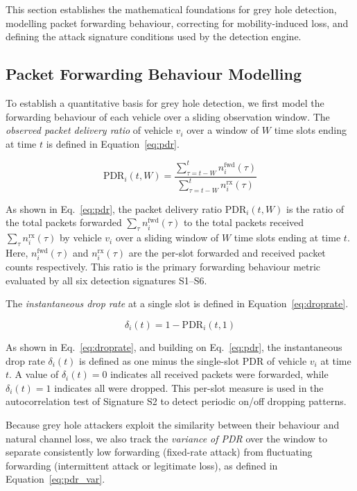 \documentclass[12pt, a4paper]{report}
\begin{document}
This section establishes the mathematical foundations for grey hole detection,
modelling packet forwarding behaviour, correcting for mobility-induced loss,
and defining the attack signature conditions used by the detection engine.

\subsection{Packet Forwarding Behaviour Modelling}

To establish a quantitative basis for grey hole detection, we first model the
forwarding behaviour of each vehicle over a sliding observation
window. The \emph{observed packet delivery ratio} of vehicle $v_i$ over a window of $W$
time slots ending at time $t$ is defined in Equation~\eqref{eq:pdr}.

\begin{equation}
\label{eq:pdr}
\text{PDR}_i(t, W) = \frac{\displaystyle\sum_{\tau=t-W}^{t} n_i^{\text{fwd}}(\tau)}
                           {\displaystyle\sum_{\tau=t-W}^{t} n_i^{\text{rx}}(\tau)}
\end{equation}

As shown in Eq.~\eqref{eq:pdr}, the packet delivery ratio $\text{PDR}_i(t, W)$ is the ratio of the total packets forwarded $\sum_\tau n_i^{\text{fwd}}(\tau)$ to the total packets received $\sum_\tau n_i^{\text{rx}}(\tau)$ by vehicle $v_i$ over a sliding window of $W$ time slots ending at time $t$. Here, $n_i^{\text{fwd}}(\tau)$ and $n_i^{\text{rx}}(\tau)$ are the per-slot forwarded and received packet counts respectively. This ratio is the primary forwarding behaviour metric evaluated by all six detection signatures S1--S6.

The \emph{instantaneous drop rate} at a single slot is defined in Equation~\eqref{eq:droprate}.

\begin{equation}
\label{eq:droprate}
\delta_i(t) = 1 - \text{PDR}_i(t, 1)
\end{equation}

As shown in Eq.~\eqref{eq:droprate}, and building on Eq.~\eqref{eq:pdr}, the instantaneous drop rate $\delta_i(t)$ is defined as one minus the single-slot PDR of vehicle $v_i$ at time $t$. A value of $\delta_i(t) = 0$ indicates all received packets were forwarded, while $\delta_i(t) = 1$ indicates all were dropped. This per-slot measure is used in the autocorrelation test of Signature S2 to detect periodic on/off dropping patterns.

Because grey hole attackers exploit the similarity between their behaviour and
natural channel loss, we also track the \emph{variance of PDR} over the window
to separate consistently low forwarding (fixed-rate attack) from fluctuating
forwarding (intermittent attack or legitimate loss), as defined in Equation~\eqref{eq:pdr_var}.
\end{document}

